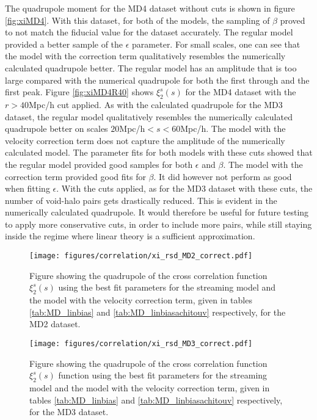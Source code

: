 The quadrupole moment for the MD4 dataset without cuts is shown in figure \ref{fig:xiMD4}. With this dataset, for both of the models, the sampling of $\beta$ proved to not match the fiducial value for the dataset accurately. The regular model provided a better sample of the $\epsilon$ parameter. For small scales, one can see that the model with the correction term qualitatively resembles the numerically calculated quadrupole better. The regular model has an amplitude that is too large compared with the numerical quadrupole for both the first through and the first peak. Figure \ref{fig:xiMD4R40} shows $\xi_2^s(s)$ for the MD4 dataset with the $r>40$Mpc/h cut applied. As with the calculated quadrupole for the MD3 dataset, the regular model qualitatively resembles the numerically calculated quadrupole better on scales $20$Mpc/h$<s<60$Mpc/h. The model with the velocity correction term does not capture the amplitude of the numerically calculated model. The parameter fits for both models with these cuts showed that the regular model provided good samples for both $\epsilon$ and $\beta$. The model with the correction term provided good fits for $\beta$. It did however not perform as good when fitting $\epsilon$. With the cuts applied, as for the MD3 dataset with these cuts, the number of void-halo pairs gets drastically reduced. This is evident in the numerically calculated quadrupole. It would therefore be useful for future testing to apply more conservative cuts, in order to include more pairs, while still staying inside the regime where linear theory is a sufficient approximation.
\begin{figure}[H]
    \texttt{[image: figures/correlation/xi\_rsd\_MD2\_correct.pdf]}
    \caption{Figure showing the quadrupole of the cross correlation function $\xi_2^s(s)$ using the best fit parameters for the streaming model and the model with the velocity correction term, given in tables \ref{tab:MD_linbias} and \ref{tab:MD_linbiasachitouv} respectively, for the MD2 dataset.}
    \label{fig:xiMD2}
\end{figure}

\begin{figure}[H]
    \texttt{[image: figures/correlation/xi\_rsd\_MD3\_correct.pdf]}
    \caption{Figure showing the quadrupole of the cross correlation function $\xi_2^s(s)$ function using the best fit parameters for the streaming model and the model with the velocity correction term, given in tables \ref{tab:MD_linbias} and \ref{tab:MD_linbiasachitouv} respectively, for the MD3 dataset.}
    \label{fig:xiMD3}
\end{figure}

